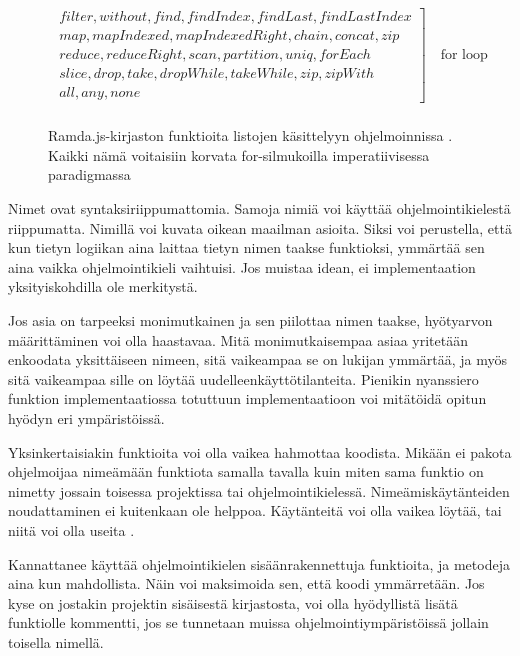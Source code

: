 \begin{figure}[ht]
    \centering
    \[
        \begin{array}{rl}
            \left.
            \begin{array}{l}
                filter, without, find, findIndex, findLast, findLastIndex \\
                map, mapIndexed, mapIndexedRight, chain, concat, zip      \\
                reduce, reduceRight, scan, partition, uniq, forEach       \\
                slice, drop, take, dropWhile, takeWhile, zip, zipWith     \\
                all, any, none
            \end{array}
            \right] \quad \text{for loop}
            \\
        \end{array}
    \]
    \caption{Ramda.js-kirjaston funktioita listojen käsittelyyn ohjelmoinnissa \cite{ramda:docs}. Kaikki nämä voitaisiin korvata for-silmukoilla imperatiivisessa paradigmassa}
    \label{fig:ramdacmds}
\end{figure}

Nimet ovat syntaksiriippumattomia. Samoja nimiä voi käyttää ohjelmointikielestä riippumatta. Nimillä voi kuvata oikean maailman asioita. Siksi voi perustella, että kun tietyn logiikan aina laittaa tietyn nimen taakse funktioksi, ymmärtää sen aina vaikka ohjelmointikieli vaihtuisi. Jos muistaa idean, ei implementaation yksityiskohdilla ole merkitystä.

Jos asia on tarpeeksi monimutkainen ja sen piilottaa nimen taakse, hyötyarvon määrittäminen voi olla haastavaa. Mitä monimutkaisempaa asiaa yritetään enkoodata yksittäiseen nimeen, sitä vaikeampaa se on lukijan ymmärtää, ja myös sitä vaikeampaa sille on löytää uudelleenkäyttötilanteita. Pienikin nyanssiero funktion implementaatiossa totuttuun implementaatioon voi mitätöidä opitun hyödyn eri ympäristöissä.

Yksinkertaisiakin funktioita voi olla vaikea hahmottaa koodista. Mikään ei pakota ohjelmoijaa nimeämään funktiota samalla tavalla kuin miten sama funktio on nimetty jossain toisessa projektissa tai ohjelmointikielessä. Nimeämiskäytänteiden noudattaminen ei kuitenkaan ole helppoa. Käytänteitä voi olla vaikea löytää, tai niitä voi olla useita \cite{ramda:docs}.

Kannattanee käyttää ohjelmointikielen sisäänrakennettuja funktioita, ja metodeja aina kun mahdollista. Näin voi maksimoida sen, että koodi ymmärretään. Jos kyse on jostakin projektin sisäisestä kirjastosta, voi olla hyödyllistä lisätä funktiolle kommentti, jos se tunnetaan muissa ohjelmointiympäristöissä jollain toisella nimellä.

